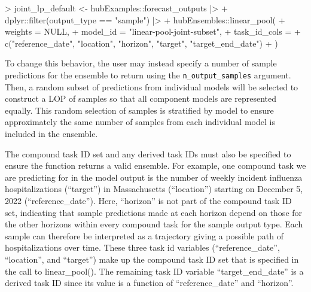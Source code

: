 \documentclass[
]{article}
\newenvironment{Shaded}{\begin{snugshade}}{\end{snugshade}}
\newcommand{\AttributeTok}[1]{\textcolor[rgb]{0.40,0.45,0.13}{#1}}
\newcommand{\ConstantTok}[1]{\textcolor[rgb]{0.56,0.35,0.01}{#1}}
\newcommand{\FunctionTok}[1]{\textcolor[rgb]{0.28,0.35,0.67}{#1}}
\newcommand{\NormalTok}[1]{\textcolor[rgb]{0.00,0.23,0.31}{#1}}
\newcommand{\OtherTok}[1]{\textcolor[rgb]{0.00,0.23,0.31}{#1}}
\newcommand{\SpecialCharTok}[1]{\textcolor[rgb]{0.37,0.37,0.37}{#1}}
\newcommand{\StringTok}[1]{\textcolor[rgb]{0.13,0.47,0.30}{#1}}
\begin{document}
\begin{Shaded}
\begin{Highlighting}[]
\SpecialCharTok{\textgreater{}}\NormalTok{ joint\_lp\_default }\OtherTok{\textless{}{-}}\NormalTok{ hubExamples}\SpecialCharTok{::}\NormalTok{forecast\_outputs }\SpecialCharTok{|\textgreater{}}
\SpecialCharTok{+}\NormalTok{   dplyr}\SpecialCharTok{::}\FunctionTok{filter}\NormalTok{(output\_type }\SpecialCharTok{==} \StringTok{"sample"}\NormalTok{) }\SpecialCharTok{|\textgreater{}}
\SpecialCharTok{+}\NormalTok{   hubEnsembles}\SpecialCharTok{::}\FunctionTok{linear\_pool}\NormalTok{(}
\SpecialCharTok{+}     \AttributeTok{weights =} \ConstantTok{NULL}\NormalTok{,}
\SpecialCharTok{+}     \AttributeTok{model\_id =} \StringTok{"linear{-}pool{-}joint{-}subset"}\NormalTok{,}
\SpecialCharTok{+}     \AttributeTok{task\_id\_cols =}
\SpecialCharTok{+}       \FunctionTok{c}\NormalTok{(}\StringTok{"reference\_date"}\NormalTok{, }\StringTok{"location"}\NormalTok{, }\StringTok{"horizon"}\NormalTok{, }\StringTok{"target"}\NormalTok{, }\StringTok{"target\_end\_date"}\NormalTok{)}
\SpecialCharTok{+}\NormalTok{   )}
\end{Highlighting}
\end{Shaded}

To change this behavior, the user may instead specify a number of sample
predictions for the ensemble to return using the
\texttt{n\_output\_samples} argument. Then, a random subset of
predictions from individual models will be selected to construct a LOP
of samples so that all component models are represented equally. This
random selection of samples is stratified by model to ensure
approximately the same number of samples from each individual model is
included in the ensemble.

The compound task ID set and any derived task IDs must also be specified
to ensure the function returns a valid ensemble. For example, one
compound task we are predicting for in the model output is the number of
weekly incident influenza hospitalizations (``target'') in Massachusetts
(``location'') starting on December 5, 2022 (``reference\_date''). Here,
``horizon'' is not part of the compound task ID set, indicating that
sample predictions made at each horizon depend on those for the other
horizons within every compound task for the sample output type. Each
sample can therefore be interpreted as a trajectory giving a possible
path of hospitalizations over time. These three task id variables
(``reference\_date'', ``location'', and ``target'') make up the compound
task ID set that is specified in the call to linear\_pool(). The
remaining task ID variable ``target\_end\_date'' is a derived task ID
since its value is a function of ``reference\_date'' and ``horizon''.
\end{document}

